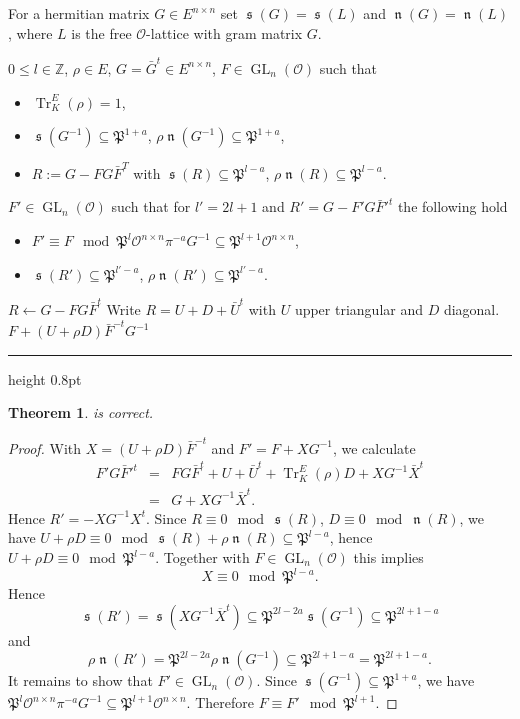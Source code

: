 \documentclass[a4paper]{amsart}
\makeatletter
\theoremstyle{definition}
\theoremstyle{plain}
\newtheorem{theorem}[definition]{Theorem}
\DeclareMathOperator{\GL}{GL}
\DeclareMathOperator{\Tr}{Tr}
\DeclareMathOperator{\scale}{\mathfrak{s}}
\DeclareMathOperator{\norm}{\mathfrak{n}}
\newcommand{\ZZ}{\mathbb{Z}}
\renewcommand{\O}{\mathcal{O}}
\newcommand{\FP}{\mathfrak{P}}
\def\hrulefill{\leavevmode\leaders\hrule height 0.8pt\hfill\kern\z@}
\makeatother
\begin{document}
For a hermitian matrix $G \in E^{n \times n}$ set $\scale(G)=\scale(L)$ and $\norm(G)=\norm(L)$, where $L$ is the free $\O$-lattice with gram matrix $G$.
%
%
%

\begingroup
{}\label{alg:lift}
\endgroup
\begin{algorithmic}[1]
\REQUIRE
$0\leq l \in \ZZ$, $\rho \in E$,
$G =\bar G^t \in E^{n\times n}$,
$F \in \GL_n(\O)$ such that
\begin{itemize}
 \item $\Tr^E_K(\rho) =1$,
\item  $\scale(G^{-1})\subseteq \FP^{1+a}$, $\rho\norm(G^{-1})\subseteq \FP^{1+a}$,
\item $R:=G - FG\bar F^T$ with $\scale(R) \subseteq \FP^{l-a}$, $\rho\norm(R) \subseteq \FP^{l-a}$.
\end{itemize}
  \ENSURE $F' \in \GL_n(\O)$ such that for $l' = 2l + 1$ and $R' = G - F'G \bar F'^t$ the following hold
\begin{itemize}
  \item $F' \equiv F \mod \FP^{l} \O^{n \times n}\pi^{-a}G^{-1} \subseteq\FP^{l+1}\O^{n \times n}$,
  \item $\scale(R') \subseteq \FP^{l'-a}$, $\rho \norm(R') \subseteq \FP^{l'-a}$.
\end{itemize}
\STATE $R \gets G - F G \bar F^t$
\STATE Write $R = U + D + \bar U^t$ with $U$ upper triangular and $D$ diagonal.
\RETURN $F + (U + \rho D)\bar F^{-t}G^{-1}$
\end{algorithmic}\hrulefill \\

\begin{theorem}
 is correct.
\end{theorem}
\begin{proof}
 With $X=(U + \rho D)\bar F^{-t}$ and $F' = F + XG^{-1}$, we calculate
 \begin{eqnarray*}
 F' G \bar F'^t%
 &=& F G \bar F^t + U + \bar U^t + \Tr^E_K(\rho)D + XG^{-1} \bar X^t\\
 &= & G + X G^{-1} \bar X^t.
 \end{eqnarray*}
  Hence $R' = -XG^{-1}X^t$.
Since $R \equiv 0 \mod \scale(R)$, $D\equiv 0 \mod \norm(R)$, we have
  $U + \rho D \equiv 0 \mod \scale(R)+\rho \norm(R) \subseteq \FP^{l-a}$, hence $U + \rho D \equiv 0 \mod  \FP^{l-a}$. Together with $F \in \GL_n(\O)$ this implies
\[X \equiv 0 \mod \FP^{l-a}.\]
Hence
\[\scale(R')=\scale(X G^{-1} \overline{X}^t) \subseteq \FP^{2l-2a}\scale(G^{-1})\subseteq\FP^{2l+1-a}\]
and
\[\rho \norm(R') = \FP^{2l-2a}\rho\norm(G^{-1})\subseteq\FP^{2l+1-a}=\FP^{2l+1-a}.\]
It remains to show that $F' \in \GL_n(\O)$.
Since $\scale(G^{-1})\subseteq \FP^{1+a}$, we have $\FP^l \O^{n \times n} \pi^{-a}G^{-1} \subseteq \FP^{l+1}\O^{n \times n}$. Therefore $F \equiv F' \mod \FP^{l+1}$.
\end{proof}
\end{document}
